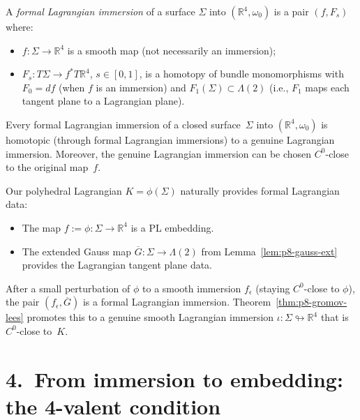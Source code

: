 \begin{definition}
A \emph{formal Lagrangian immersion} of a surface $\Sigma$ into
$(\mathbb{R}^4,\omega_0)$ is a pair $(f, F_s)$ where:
\begin{itemize}
\item $f: \Sigma\to\mathbb{R}^4$ is a smooth map (not necessarily an immersion);
\item $F_s: T\Sigma\to f^*T\mathbb{R}^4$, $s\in[0,1]$, is a homotopy of
bundle monomorphisms with $F_0 = df$ (when $f$ is an immersion) and
$F_1(\Sigma)\subset\Lambda(2)$ (i.e., $F_1$ maps each tangent plane to a
Lagrangian plane).
\end{itemize}
\end{definition}

\begin{theorem}
\label{thm:p8-gromov-lees}
Every formal Lagrangian immersion of a closed surface~$\Sigma$ into
$(\mathbb{R}^4,\omega_0)$ is homotopic (through formal Lagrangian immersions)
to a genuine Lagrangian immersion. Moreover, the genuine Lagrangian immersion
can be chosen $C^0$-close to the original map~$f$.
\end{theorem}

Our polyhedral Lagrangian $K = \phi(\Sigma)$ naturally provides formal
Lagrangian data:
\begin{itemize}
\item The map $f := \phi: \Sigma\to\mathbb{R}^4$ is a PL embedding.
\item The extended Gauss map $\overline{G}: \Sigma\to\Lambda(2)$ from
Lemma~\ref{lem:p8-gauss-ext} provides the Lagrangian tangent plane data.
\end{itemize}

After a small perturbation of $\phi$ to a smooth immersion $f_\epsilon$
(staying $C^0$-close to $\phi$), the pair $(f_\epsilon, \overline{G})$ is
a formal Lagrangian immersion. Theorem~\ref{thm:p8-gromov-lees} promotes this
to a genuine smooth Lagrangian immersion $\iota: \Sigma\looparrowright
\mathbb{R}^4$ that is $C^0$-close to~$K$.

\section*{4.\ From immersion to embedding: the 4-valent condition}
\label{sec:p8-embedding}

